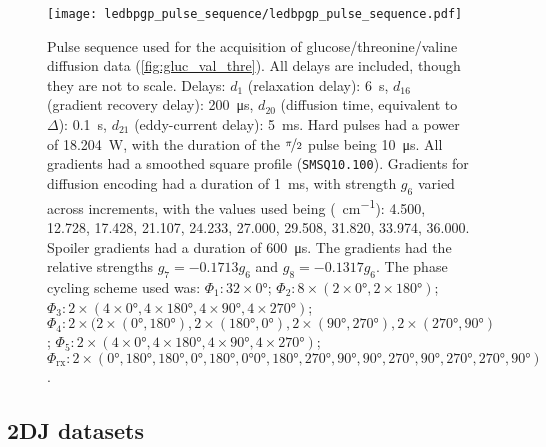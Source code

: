 \begin{figure}[H]
    \centering
    \texttt{[image: ledbpgp\_pulse\_sequence/ledbpgp\_pulse\_sequence.pdf]}
    \caption[
        Pulse sequence used for the acquisition of glucose/threonine/valine
        diffusion data.
    ]{
        Pulse sequence used for the acquisition of glucose/threonine/valine
        diffusion data (\cref{fig:gluc_val_thre}). All
        delays are included, though they are not to scale.
        Delays:
        $d_1$ (relaxation delay): \qty{6}{\second},
        $d_{16}$ (gradient recovery delay): \qty{200}{\micro\second},
        $d_{20}$ (diffusion time, equivalent to $\Delta$): \qty{0.1}{\second},
        $d_{21}$ (eddy-current delay): \qty{5}{\milli\second}.
        Hard pulses had a power of \qty{18.204}{\watt},
        with the duration of the $\nicefrac{\pi}{2}$ pulse being
        \qty{10}{\micro\second}.
        All gradients had a smoothed square profile
        (\texttt{SMSQ10.100}).
        Gradients for diffusion encoding had a duration of
        \qty{1}{\milli\second}, with strength $g_6$ varied across increments,
        with the values used being (\unit{\gauss \per \centi \meter}):
        4.500,
        12.728,
        17.428,
        21.107,
        24.233,
        27.000,
        29.508,
        31.820,
        33.974,
        36.000.
        Spoiler gradients had a duration of \qty{600}{\micro\second}. The
        gradients had the relative strengths $g_7=-0.1713g_6$ and
        $g_8=-0.1317g_6$.
        The phase cycling scheme used was:
        $\Phi_1: 32 \times \ang{0}$;
        $\Phi_2: 8 \times (2 \times \ang{0}, 2 \times \ang{180})$;
        $\Phi_3: 2 \times (4 \times \ang{0}, 4 \times \ang{180}, 4 \times \ang{90}, 4 \times \ang{270})$;
        $\Phi_4: 2 \times (2 \times (\ang{0}, \ang{180}), 2 \times (\ang{180}, \ang{0}), 2 \times (\ang{90}, \ang{270}), 2 \times (\ang{270}, \ang{90})$;
        $\Phi_5: 2 \times (4 \times \ang{0}, 4 \times \ang{180}, 4 \times \ang{90}, 4 \times \ang{270})$;
        $\Phi_{\text{rx}}: 2 \times (\ang{0}, \ang{180}, \ang{180}, \ang{0}, \ang{180}, \ang{0} \ang{0}, \ang{180},
        \ang{270}, \ang{90}, \ang{90}, \ang{270}, \ang{90}, \ang{270}, \ang{270}, \ang{90})$.
    }
    \label{fig:ledbpgp2s}
\end{figure}

\subsection{\acs{2DJ} datasets}
\label{subsec:cupid-experimental}

